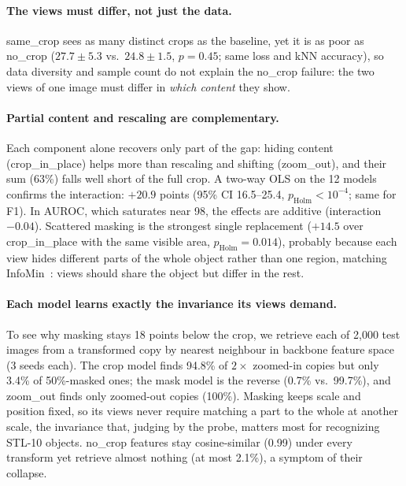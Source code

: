 \documentclass[10pt,twocolumn,letterpaper]{article}
\begin{document}
\paragraph{The views must differ, not just the data.}
same\_crop sees as many distinct crops as the baseline, yet it is as poor as no\_crop ($27.7\pm5.3$ vs.\ $24.8\pm1.5$, $p{=}0.45$; same loss and kNN accuracy), so data diversity and sample count do not explain the no\_crop failure: the two views of one image must differ in \emph{which content} they show.

\paragraph{Partial content and rescaling are complementary.}
Each component alone recovers only part of the gap: hiding content (crop\_in\_place) helps more than rescaling and shifting (zoom\_out), and their sum (63\%) falls well short of the full crop. A two-way OLS on the 12 models confirms the interaction: $+20.9$ points (95\% CI 16.5--25.4, $p_\text{Holm}<10^{-4}$; same for F1). In AUROC, which saturates near 98, the effects are additive (interaction $-0.04$).
Scattered masking is the strongest single replacement ($+14.5$ over crop\_in\_place with the same visible area, $p_\text{Holm}{=}0.014$), probably because each view hides different parts of the whole object rather than one region, matching InfoMin~\cite{tian2020infomin}: views should share the object but differ in the rest.

\paragraph{Each model learns exactly the invariance its views demand.}
To see why masking stays 18 points below the crop, we retrieve each of 2,000 test images from a transformed copy by nearest neighbour in backbone feature space (3 seeds each).
The crop model finds 94.8\% of $2\times$ zoomed-in copies but only 3.4\% of 50\%-masked ones; the mask model is the reverse (0.7\% vs.\ 99.7\%), and zoom\_out finds only zoomed-out copies (100\%).
Masking keeps scale and position fixed, so its views never require matching a part to the whole at another scale, the invariance that, judging by the probe, matters most for recognizing STL-10 objects.
no\_crop features stay cosine-similar (0.99) under every transform yet retrieve almost nothing (at most 2.1\%), a symptom of their collapse.
\end{document}
